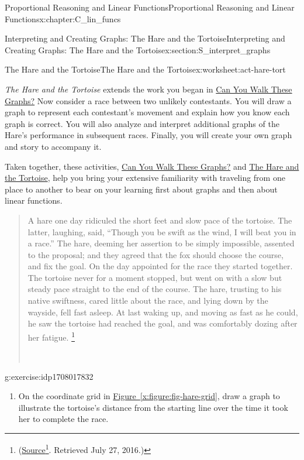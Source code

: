 \documentclass[oneside,10pt,]{book}
\newcommand{\xreffont}{\relax}
\newcommand{\pubtitle}[1]{\textsl{#1}}
\numberwithin{equation}{chapter}
\begin{document}
\begin{chapterptx}{Proportional Reasoning and Linear Functions}{}{Proportional Reasoning and Linear Functions}{}{}{x:chapter:C_lin_funcs}
\begin{sectionptx}{Interpreting and Creating Graphs: The Hare and the Tortoise}{}{Interpreting and Creating Graphs: The Hare and the Tortoise}{}{}{x:section:S_interpret_graphs}
\begin{worksheet-subsection}{The Hare and the Tortoise}{}{The Hare and the Tortoise}{}{}{x:worksheet:act-hare-tort}
\begin{introduction}{}
\pubtitle{The Hare and the Tortoise} extends the work you began in \hyperref[x:worksheet:act-walk-graphs]{Can You Walk These Graphs?} Now consider a race between two unlikely contestants. You will draw a graph to represent each contestant's movement and explain how you know each graph is correct. You will also analyze and interpret additional graphs of the Hare's performance in subsequent races. Finally, you will create your own graph and story to accompany it.%
\par
Taken together, these activities, \hyperref[x:worksheet:act-walk-graphs]{Can You Walk These Graphs?} and \hyperref[x:worksheet:act-hare-tort]{The Hare and the Tortoise}, help you bring your extensive familiarity with traveling from one place to another to bear on your learning first about graphs and then about linear functions. \begin{quote}%
A hare one day ridiculed the short feet and slow pace of the tortoise. The latter, laughing, said, ``Though you be swift as the wind, I will beat you in a race.'' The hare, deeming her assertion to be simply impossible, assented to the proposal; and they agreed that the fox should choose the course, and fix the goal. On the day appointed for the race they started together. The tortoise never for a moment stopped, but went on with a slow but steady pace straight to the end of the course. The hare, trusting to his native swiftness, cared little about the race, and lying down by the wayside, fell fast asleep. At last waking up, and moving as fast as he could, he saw the tortoise had reached the goal, and was comfortably dozing after her fatigue. \footnote{(\href{http://www.pitt.edu/\~dash/type0275.html\#townsend}{Source}\footnote{\nolinkurl{pitt.edu/\~dash/type0275.html\#townsend}\label{g:fn:idp1708021928}}. Retrieved July 27, 2016.)\label{g:fn:idp1708023720}}%
\nopagebreak\par%
\hfill{}\\\par
\end{quote}
%
\end{introduction}%
\begin{divisionexercise}{1}{}{}{g:exercise:idp1708017832}%
\begin{enumerate}[font=\bfseries,label=(\alph*),ref=\alph*]
\item{}On the coordinate grid in \hyperref[x:figure:fig-hare-grid]{Figure~{\xreffont\ref{x:figure:fig-hare-grid}}}, draw a graph to illustrate the tortoise's distance from the starting line over the time it took her to complete the race.%

\end{enumerate}
\end{divisionexercise}
\end{worksheet-subsection}
\end{sectionptx}
\end{chapterptx}
\end{document}
